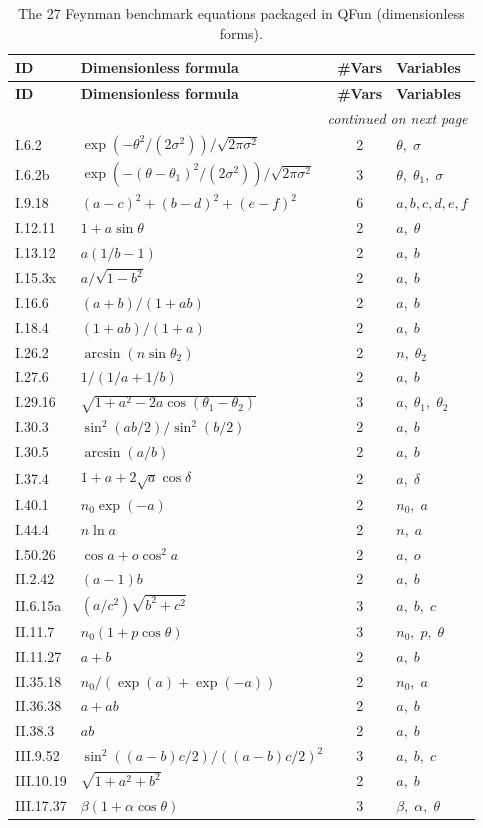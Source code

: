 \documentclass[11pt]{article}
\begin{document}
\begin{longtable}{l l c l}
\caption{The 27 Feynman benchmark equations packaged in QFun
(dimensionless forms).}\label{tab:feynman}\\
\toprule
\textbf{ID} & \textbf{Dimensionless formula} & \textbf{\#Vars} & \textbf{Variables} \\
\midrule
\endfirsthead
\toprule
\textbf{ID} & \textbf{Dimensionless formula} & \textbf{\#Vars} & \textbf{Variables} \\
\midrule
\endhead
\midrule
\multicolumn{4}{r}{\emph{continued on next page}} \\
\endfoot
\bottomrule
\endlastfoot
I.6.2     & $\exp(-\theta^2/(2\sigma^2))/\sqrt{2\pi\sigma^2}$ & 2 & $\theta,\;\sigma$ \\
I.6.2b    & $\exp(-(\theta-\theta_1)^2/(2\sigma^2))/\sqrt{2\pi\sigma^2}$ & 3 & $\theta,\;\theta_1,\;\sigma$ \\
I.9.18    & $(a-c)^2+(b-d)^2+(e-f)^2$ & 6 & $a,b,c,d,e,f$ \\
I.12.11   & $1+a\sin\theta$ & 2 & $a,\;\theta$ \\
I.13.12   & $a(1/b-1)$ & 2 & $a,\;b$ \\
I.15.3x   & $a/\sqrt{1-b^2}$ & 2 & $a,\;b$ \\
I.16.6    & $(a+b)/(1+ab)$ & 2 & $a,\;b$ \\
I.18.4    & $(1+ab)/(1+a)$ & 2 & $a,\;b$ \\
I.26.2    & $\arcsin(n\sin\theta_2)$ & 2 & $n,\;\theta_2$ \\
I.27.6    & $1/(1/a+1/b)$ & 2 & $a,\;b$ \\
I.29.16   & $\sqrt{1+a^2-2a\cos(\theta_1-\theta_2)}$ & 3 & $a,\;\theta_1,\;\theta_2$ \\
I.30.3    & $\sin^2(ab/2)/\sin^2(b/2)$ & 2 & $a,\;b$ \\
I.30.5    & $\arcsin(a/b)$ & 2 & $a,\;b$ \\
I.37.4    & $1+a+2\sqrt{a}\cos\delta$ & 2 & $a,\;\delta$ \\
I.40.1    & $n_0\exp(-a)$ & 2 & $n_0,\;a$ \\
I.44.4    & $n\ln a$ & 2 & $n,\;a$ \\
I.50.26   & $\cos a + o\cos^2 a$ & 2 & $a,\;o$ \\
II.2.42   & $(a-1)b$ & 2 & $a,\;b$ \\
II.6.15a  & $(a/c^2)\sqrt{b^2+c^2}$ & 3 & $a,\;b,\;c$ \\
II.11.7   & $n_0(1+p\cos\theta)$ & 3 & $n_0,\;p,\;\theta$ \\
II.11.27  & $a+b$ & 2 & $a,\;b$ \\
II.35.18  & $n_0/(\exp(a)+\exp(-a))$ & 2 & $n_0,\;a$ \\
II.36.38  & $a+ab$ & 2 & $a,\;b$ \\
II.38.3   & $ab$ & 2 & $a,\;b$ \\
III.9.52  & $\sin^2((a-b)c/2)/((a-b)c/2)^2$ & 3 & $a,\;b,\;c$ \\
III.10.19 & $\sqrt{1+a^2+b^2}$ & 2 & $a,\;b$ \\
III.17.37 & $\beta(1+\alpha\cos\theta)$ & 3 & $\beta,\;\alpha,\;\theta$ \\
\end{longtable}
\end{document}
